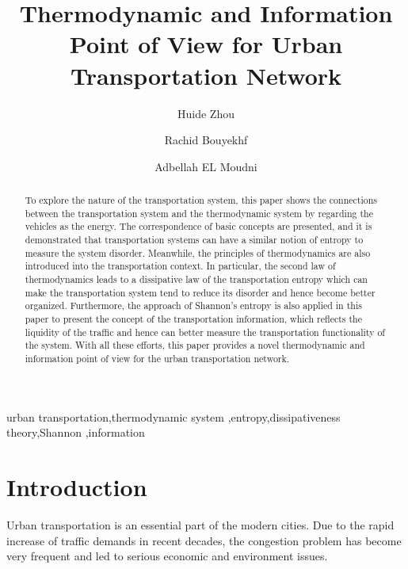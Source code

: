 \documentclass[preprint,authoryear,12pt]{elsarticle}
\begin{document}
\begin{frontmatter}

\title{Thermodynamic and Information Point of View for Urban
Transportation Network}
\author[SeT]{Huide Zhou}
\author[SeT]{Rachid Bouyekhf}
\author[SeT]{Adbellah EL Moudni}
\address[SeT]{Laboratoire Syst\`{e}mes et Transports (SeT),\\
Universit\'{e} de Technologie de Belfort-Montb\'{e}liard (UTBM)\\
Rue Thierry Mieg, 90010 Belfort Cedex, France}

\begin{abstract}
To explore the nature of the transportation system, this paper shows the connections between the transportation system and the thermodynamic system by regarding the vehicles as the energy. The correspondence of basic concepts are presented, and it is demonstrated that transportation systems can have a similar notion of entropy to measure the system disorder. Meanwhile, the principles of thermodynamics are also introduced into the transportation context. In particular, the second law of thermodynamics leads to a dissipative law of the transportation entropy which can make the transportation system tend to reduce its disorder and hence become better organized. Furthermore, the approach of Shannon's entropy is also applied in this paper to present the concept of the transportation information, which reflects the liquidity of the traffic and hence can better measure the transportation functionality of the system. With all these efforts, this paper provides a novel thermodynamic and information point of view for the urban transportation network.
\end{abstract}

\begin{keyword}
urban transportation\sep thermodynamic system \sep entropy\sep dissipativeness theory\sep Shannon \sep information
\end{keyword}

\end{frontmatter}

\section{Introduction}

Urban transportation is an essential part of the modern cities. Due to the rapid increase of traffic demands in recent decades, the congestion problem has become very frequent and led to serious economic and environment issues.
\end{document}
